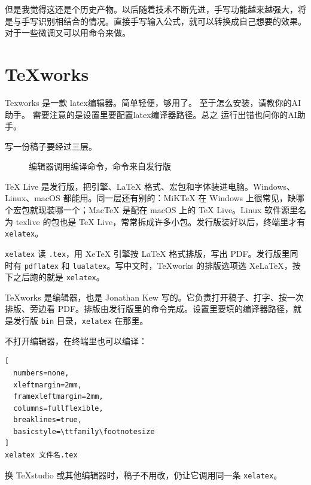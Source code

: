 但是我觉得这还是个历史产物。以后随着技术不断先进，手写功能越来越强大，将是与手写识别相结合的情况。直接手写输入公式，就可以转换成自己想要的效果。对于一些微调又可以用命令来做。




\section{TeXworks}
\begin{xiaonao}[怎么安装？]
Texworks 是一款 latex编辑器。简单轻便，够用了。 至于怎么安装，请教你的AI助手。 需要注意的是设置里要配置latex编译器路径。总之 运行出错也问你的AI助手。
\end{xiaonao}

写一份稿子要经过三层。

\begin{figure}[htbp]
\centering
{}
\caption{编辑器调用编译命令，命令来自发行版}
\end{figure}

\TeX{} Live 是发行版，把引擎、\LaTeX{} 格式、宏包和字体装进电脑。Windows、Linux、macOS 都能用。同一层还有别的：MiKTeX 在 Windows 上很常见，缺哪个宏包就现装哪一个；MacTeX 是配在 macOS 上的 \TeX{} Live。Linux 软件源里名为 texlive 的包也是 \TeX{} Live，常常拆成许多小包。发行版装好以后，终端里才有 \verb|xelatex|。

\verb|xelatex| 读 \verb|.tex|，用 Xe\TeX{} 引擎按 \LaTeX{} 格式排版，写出 PDF。发行版里同时有 \verb|pdflatex| 和 \verb|lualatex|。写中文时，TeXworks 的排版选项选 Xe\LaTeX{}，按下之后跑的就是 \verb|xelatex|。

TeXworks 是编辑器，也是 Jonathan Kew 写的。它负责打开稿子、打字、按一次排版、旁边看 PDF。排版由发行版里的命令完成。设置里要填的编译器路径，就是发行版 \verb|bin| 目录，\verb|xelatex| 在那里。

不打开编辑器，在终端里也可以编译：
\begin{lstlisting}[
  numbers=none,
  xleftmargin=2mm,
  framexleftmargin=2mm,
  columns=fullflexible,
  breaklines=true,
  basicstyle=\ttfamily\footnotesize
]
xelatex 文件名.tex
\end{lstlisting}
换 TeXstudio 或其他编辑器时，稿子不用改，仍让它调用同一条 \verb|xelatex|。



